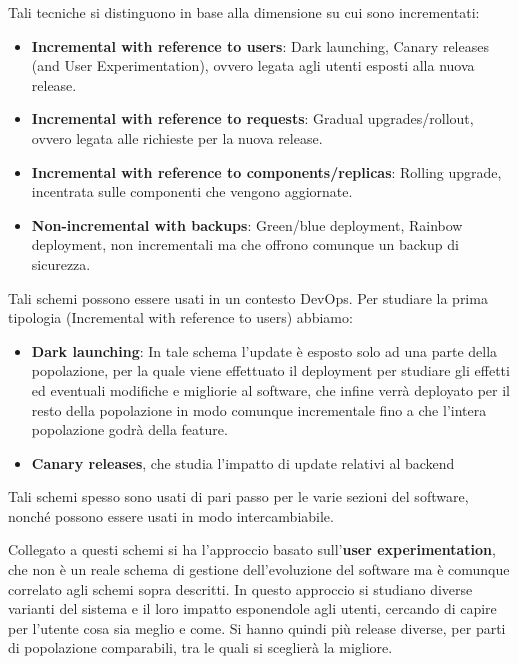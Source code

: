 Tali tecniche si distinguono in base alla dimensione su cui sono incrementati:
\begin{itemize}
      \item \textbf{Incremental with reference to users}: Dark launching, Canary
            releases (and User Experimentation), ovvero legata agli utenti esposti
            alla nuova release.
      \item \textbf{Incremental with reference to requests}: Gradual upgrades/rollout,
            ovvero legata alle richieste per la nuova release.
      \item \textbf{Incremental with reference to components/replicas}: Rolling
            upgrade, incentrata sulle componenti che vengono aggiornate.
      \item \textbf{Non-incremental with backups}: Green/blue deployment,
            Rainbow deployment, non incrementali ma che offrono comunque un backup
            di sicurezza.
\end{itemize}
Tali schemi possono essere usati in un contesto DevOps. Per studiare la prima
tipologia (Incremental with reference to users) abbiamo:
\begin{itemize}
      \item \textbf{Dark launching}: In tale schema l'update è esposto solo ad una
            parte della popolazione, per la quale viene effettuato il deployment
            per studiare gli effetti ed eventuali modifiche e migliorie al software,
            che infine verrà deployato per il resto della popolazione in modo
            comunque incrementale fino a che l'intera popolazione godrà della feature.
      \item \textbf{Canary releases}, che studia l'impatto di update relativi al
            backend
\end{itemize}

Tali schemi spesso sono usati di pari passo per le varie sezioni del software,
nonché possono essere usati in modo intercambiabile.

Collegato a questi schemi si ha l'approccio basato sull'\textbf{user experimentation},
che non è un reale schema di gestione dell'evoluzione del software ma è comunque
correlato agli schemi sopra descritti. In questo approccio si studiano diverse
varianti del sistema e il loro impatto esponendole agli utenti, cercando di capire
per l'utente cosa sia meglio e come. Si hanno quindi più release diverse, per
parti di popolazione comparabili, tra le quali si sceglierà la migliore.

